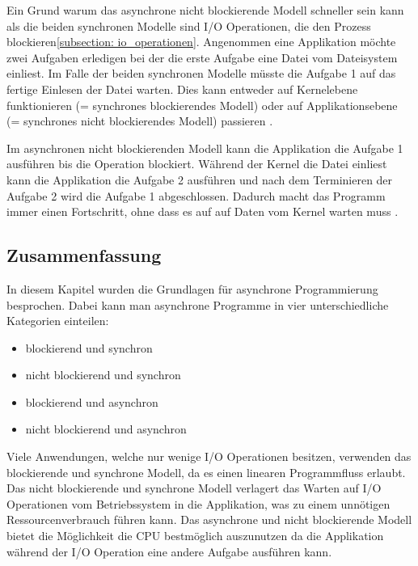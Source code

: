 Ein Grund warum das asynchrone nicht blockierende Modell schneller sein kann als die beiden synchronen Modelle sind I/O Operationen, die den Prozess blockieren\ref{subsection: io_operationen}. Angenommen eine Applikation möchte zwei Aufgaben erledigen bei der die erste Aufgabe eine Datei vom Dateisystem einliest. Im Falle der beiden synchronen Modelle müsste die Aufgabe 1 auf das fertige Einlesen der Datei warten. Dies kann entweder auf Kernelebene funktionieren (= synchrones blockierendes Modell) oder auf Applikationsebene (= synchrones nicht blockierendes Modell) passieren \cite[]{Pet2015}. 

Im asynchronen nicht blockierenden Modell kann die Applikation die Aufgabe 1 ausführen bis die Operation blockiert. Während der Kernel die Datei einliest kann die Applikation die Aufgabe 2 ausführen und nach dem Terminieren der Aufgabe 2 wird die Aufgabe 1 abgeschlossen. Dadurch macht das Programm immer einen Fortschritt, ohne dass es auf auf Daten vom Kernel warten muss \cite[]{Pet2015}.


\subsection{Zusammenfassung}

In diesem Kapitel wurden die Grundlagen für asynchrone Programmierung besprochen. Dabei kann man asynchrone Programme in vier unterschiedliche Kategorien einteilen:

\begin{itemize}
  \item blockierend und synchron
  \item nicht blockierend und synchron
  \item blockierend und asynchron
  \item nicht blockierend und asynchron
\end{itemize}

Viele Anwendungen, welche nur wenige I/O Operationen besitzen, verwenden das blockierende und synchrone Modell, da es einen linearen Programmfluss erlaubt. Das nicht blockierende und synchrone Modell verlagert das Warten auf I/O Operationen vom Betriebssystem in die Applikation, was zu einem unnötigen Ressourcenverbrauch führen kann. Das asynchrone und nicht blockierende Modell bietet die Möglichkeit die CPU bestmöglich auszunutzen da die Applikation während der I/O Operation eine andere Aufgabe ausführen kann.